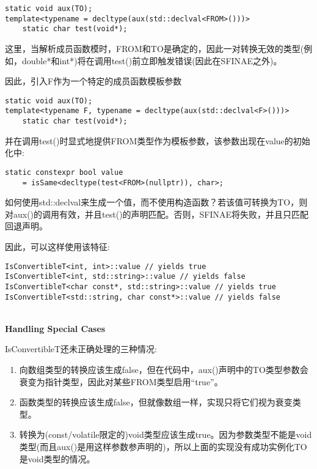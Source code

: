 \begin{lstlisting}[style=styleCXX]
static void aux(TO);
template<typename = decltype(aux(std::declval<FROM>()))>
	static char test(void*);
\end{lstlisting}

这里，当解析成员函数模时，FROM和TO是确定的，因此一对转换无效的类型(例如，double*和int*)将在调用test()前立即触发错误(因此在SFINAE之外)。

因此，引入F作为一个特定的成员函数模板参数

\begin{lstlisting}[style=styleCXX]
static void aux(TO);
template<typename F, typename = decltype(aux(std::declval<F>()))>
	static char test(void*);
\end{lstlisting}

并在调用test()时显式地提供FROM类型作为模板参数，该参数出现在value的初始化中:

\begin{lstlisting}[style=styleCXX]
static constexpr bool value
	= isSame<decltype(test<FROM>(nullptr)), char>;
\end{lstlisting}

如何使用std::declval来生成一个值，而不使用构造函数？若该值可转换为TO，则对aux()的调用有效，并且test()的声明匹配。否则，SFINAE将失败，并且只匹配回退声明。

因此，可以这样使用该特征:

\begin{lstlisting}[style=styleCXX]
IsConvertibleT<int, int>::value // yields true
IsConvertibleT<int, std::string>::value // yields false
IsConvertibleT<char const*, std::string>::value // yields true
IsConvertibleT<std::string, char const*>::value // yields false
\end{lstlisting}

\hspace*{\fill} \\ %
\noindent
\textbf{Handling Special Cases}

IsConvertibleT还未正确处理的三种情况:

\begin{enumerate}
\item
向数组类型的转换应该生成false，但在代码中，aux()声明中的TO类型参数会衰变为指针类型，因此对某些FROM类型启用“true”。

\item
函数类型的转换应该生成false，但就像数组一样，实现只将它们视为衰变类型。

\item
转换为(const/volatile限定的)void类型应该生成true。因为参数类型不能是void类型(而且aux()是用这样参数参声明的)，所以上面的实现没有成功实例化TO是void类型的情况。
\end{enumerate}

